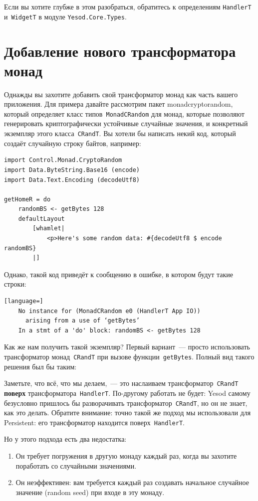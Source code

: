 Если вы хотите глубже в этом разобраться, обратитесь к определениям
\lstinline'HandlerT' и~\lstinline'WidgetT' в модуле
\lstinline'Yesod.Core.Types'.

\section{Добавление нового трансформатора монад}
Однажды вы захотите добавить свой трансформатор монад как часть вашего
приложения. Для примера давайте рассмотрим пакет
%
{monadcryptorandom}, который определяет класс типов~\lstinline'MonadCRandom'
для монад, которые позволяют генерировать криптографически устойчивые случайные
значения, и конкретный экземпляр этого класса~\lstinline'CRandT'. Вы хотели бы
написать некий код, который создаёт случайную строку байтов, например:
\begin{lstlisting}
import Control.Monad.CryptoRandom
import Data.ByteString.Base16 (encode)
import Data.Text.Encoding (decodeUtf8)

getHomeR = do
    randomBS <- getBytes 128
    defaultLayout
        [whamlet|
            <p>Here's some random data: #{decodeUtf8 $ encode randomBS}
        |]
\end{lstlisting}

Однако, такой код приведёт к сообщению в ошибке, в котором будут такие строки:
\begin{lstlisting}[language=]
    No instance for (MonadCRandom e0 (HandlerT App IO))
      arising from a use of ‘getBytes’
    In a stmt of a 'do' block: randomBS <- getBytes 128
\end{lstlisting}

Как же нам получить такой экземпляр? Первый вариант~--- просто использовать
трансформатор монад~\lstinline'CRandT' при вызове функции~\lstinline'getBytes'.
Полный вид такого решения был бы таким:


Заметьте, что всё, что мы делаем,~--- это наслаиваем
трансформатор~\lstinline'CRandT' \textbf{поверх}
трансформатора~\lstinline'HandlerT'. По-другому работать не будет: Yesod самому
безусловно пришлось бы разворачивать трансформатор~\lstinline'CRandT', но он не
знает, как это делать. Обратите внимание: точно такой же подход мы использовали
для Persistent: его трансформатор находится поверх~\lstinline'HandlerT'.

Но у этого подхода есть два недостатка:
\begin{enumerate}
    \item Он требует погружения в другую монаду каждый раз, когда вы захотите
        поработать со случайными значениями.

    \item Он неэффективен: вам требуется каждый раз создавать начальное
        случайное значение (random seed) при входе в эту монаду.
\end{enumerate}

